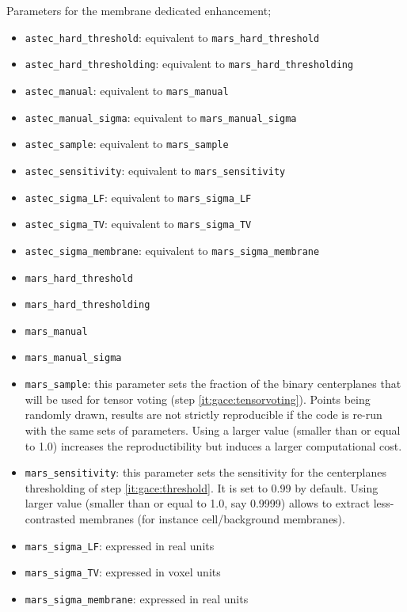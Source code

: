 Parameters for the membrane dedicated enhancement;
\begin{itemize}
\itemsep -0.5ex
\item \texttt{astec\_hard\_threshold}: equivalent to
      \texttt{mars\_hard\_threshold}
\item \texttt{astec\_hard\_thresholding}: equivalent to
      \texttt{mars\_hard\_thresholding}
\item \texttt{astec\_manual}: equivalent to
      \texttt{mars\_manual}
\item \texttt{astec\_manual\_sigma}: equivalent to
      \texttt{mars\_manual\_sigma}
\item \texttt{astec\_sample}: equivalent to
      \texttt{mars\_sample}
\item \texttt{astec\_sensitivity}: equivalent to
      \texttt{mars\_sensitivity}
\item \texttt{astec\_sigma\_LF}: equivalent to
      \texttt{mars\_sigma\_LF}
\item \texttt{astec\_sigma\_TV}: equivalent to
      \texttt{mars\_sigma\_TV}
\item \texttt{astec\_sigma\_membrane}: equivalent to
      \texttt{mars\_sigma\_membrane}
\item \texttt{mars\_hard\_threshold}
\item \texttt{mars\_hard\_thresholding}
\item \texttt{mars\_manual}
\item \texttt{mars\_manual\_sigma}
\item \texttt{mars\_sample}: this parameter sets the fraction of the binary centerplanes that will be used for tensor voting (step \ref{it:gace:tensorvoting}). Points being randomly drawn, results are not strictly reproducible if the code is re-run with the same sets of parameters. Using a larger value (smaller than or equal to 1.0) increases the reproductibility but induces a larger computational cost.
\item \texttt{mars\_sensitivity}: this parameter sets the sensitivity for the centerplanes thresholding of step \ref{it:gace:threshold}. It is set to 0.99 by default. Using larger value (smaller than or equal to 1.0, say 0.9999) allows to extract less-contrasted membranes (for instance cell/background membranes).
\item \texttt{mars\_sigma\_LF}: expressed in real units
\item \texttt{mars\_sigma\_TV}: expressed in voxel units
\item \texttt{mars\_sigma\_membrane}: expressed in real units
\end{itemize}

